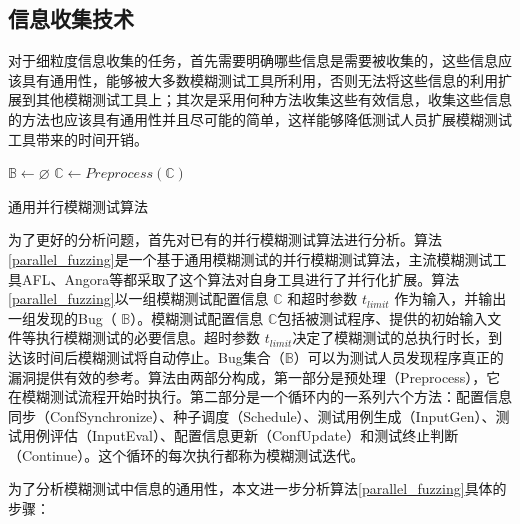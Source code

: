 \documentclass[master]{thesis-uestc}
\begin{document}
\subsection{信息收集技术}
对于细粒度信息收集的任务，首先需要明确哪些信息是需要被收集的，这些信息应该具有通用性，能够被大多数模糊测试工具所利用，否则无法将这些信息的利用扩展到其他模糊测试工具上；其次是采用何种方法收集这些有效信息，收集这些信息的方法也应该具有通用性并且尽可能的简单，这样能够降低测试人员扩展模糊测试工具带来的时间开销。
\begin{algorithm}[t]
    $\mathbb{B} \leftarrow \varnothing$ \;
    $\mathbb{C} \leftarrow Preprocess(\mathbb{C})$\;
    \caption{通用并行模糊测试算法}
    \label{parallel_fuzzing}
\end{algorithm}

\vspace{-18pt}
为了更好的分析问题，首先对已有的并行模糊测试算法进行分析。算法\ref{parallel_fuzzing}是一个基于通用模糊测试的并行模糊测试算法，主流模糊测试工具AFL、Angora等都采取了这个算法对自身工具进行了并行化扩展。算法\ref{parallel_fuzzing}以一组模糊测试配置信息 $\mathbb{C}$ 和超时参数 $t_{limit}$ 作为输入，并输出一组发现的Bug（  $\mathbb{B}$）。模糊测试配置信息 $\mathbb{C}$包括被测试程序、提供的初始输入文件等执行模糊测试的必要信息。超时参数 $t_{limit}$决定了模糊测试的总执行时长，到达该时间后模糊测试将自动停止。Bug集合（$\mathbb{B}$）可以为测试人员发现程序真正的漏洞提供有效的参考。算法由两部分构成，第一部分是预处理（Preprocess），它在模糊测试流程开始时执行。第二部分是一个循环内的一系列六个方法：配置信息同步（ConfSynchronize）、种子调度（Schedule）、测试用例生成（InputGen）、测试用例评估（InputEval）、配置信息更新（ConfUpdate）和测试终止判断（Continue）。这个循环的每次执行都称为模糊测试迭代。

为了分析模糊测试中信息的通用性，本文进一步分析算法\ref{parallel_fuzzing}具体的步骤：
\end{document}
